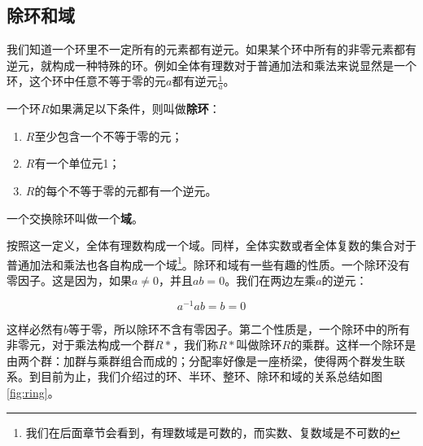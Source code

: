 \documentclass[b5paper]{ctexart}
\begin{document}
\begin{Exercise}
\end{Exercise}

\subsection{除环和域}

我们知道一个环里不一定所有的元素都有逆元。如果某个环中所有的非零元素都有逆元，就构成一种特殊的环。例如全体有理数对于普通加法和乘法来说显然是一个环，这个环中任意不等于零的元$a$都有逆元$\frac{1}{a}$。

\begin{definition}
一个环$R$如果满足以下条件，则叫做\textbf{除环}：
\begin{enumerate}
\item $R$至少包含一个不等于零的元；
\item $R$有一个单位元1；
\item $R$的每个不等于零的元都有一个逆元。
\end{enumerate}
\end{definition}

\begin{definition}
一个交换除环叫做一个\textbf{域}。
\end{definition}

按照这一定义，全体有理数构成一个域。同样，全体实数或者全体复数的集合对于普通加法和乘法也各自构成一个域\footnote{我们在后面章节会看到，有理数域是可数的，而实数、复数域是不可数的}。除环和域有一些有趣的性质。一个除环没有零因子。这是因为，如果$a \neq 0$，并且$ab = 0$。我们在两边左乘$a$的逆元：

\[
a^{-1}ab = b = 0
\]

这样必然有$b$等于零，所以除环不含有零因子。第二个性质是，一个除环中的所有非零元，对于乘法构成一个群$R*$，我们称$R*$叫做除环$R$的乘群。这样一个除环是由两个群：加群与乘群组合而成的；分配率好像是一座桥梁，使得两个群发生联系。到目前为止，我们介绍过的环、半环、整环、除环和域的关系总结如图\ref{fig:ring}。
\end{document}
